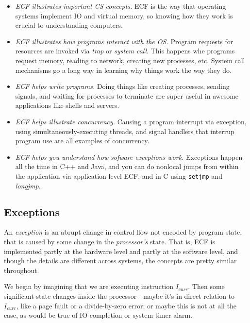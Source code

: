 \documentclass[fleqn]{article}
\begin{document}
\begin{itemize}
\item \textit{ECF illustrates important CS concepts.} ECF is the way that operating systems implement IO and virtual memory, so knowing how they work is crucial to understanding computers.

\item \textit{ECF illustrates how programs interact with the OS.} Program requests for resources are invoked via \textit{trap} or \textit{system call}. This happens whe programs request memory, reading to network, creating new processes, etc. System call mechanisms go a long way in learning why things work the way they do.

\item \textit{ECF helps write programs.} Doing things like creating processes, sending signals, and waiting for processes to terminate are super useful in awesome applications like shells and servers.

\item \textit{ECF helps illustrate concurrency.} Causing a program interrupt via exception, using simultaneously-executing threads, and signal handlers that interrup program use are all examples of concurrency.

\item \textit{ECF helps you understand how sofware exceptions work.} Exceptions happen all the time in C++ and Java, and you can do nonlocal jumps from within the application via application-level ECF, and in C using \texttt{setjmp} and \textit{longjmp}.
\end{itemize}

\subsection{Exceptions}

An \textit{exception} is an abrupt change in control flow not encoded by program state, that is caused by some change in the \textit{processor's} state. That is, ECF is implemented partly at the hardware level and partly at the software level, and though the details are different across systems, the concepts are pretty similar throughout.

We begin by imagining that we are executing instruction $I_{curr}$. Then some significant state changes inside the processor---maybe it's in direct relation to $I_{curr}$, like a page fault or a divide-by-zero error; or maybe this is not at all the case, as would be true of IO completion or system timer alarm.
\end{document}
